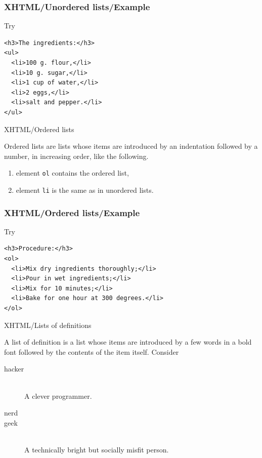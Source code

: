 %
\begin{frame}[containsverbatim]
\frametitle{XHTML/Unordered lists/Example}

Try
\begin{verbatim}
<h3>The ingredients:</h3>
<ul>
  <li>100 g. flour,</li>
  <li>10 g. sugar,</li>
  <li>1 cup of water,</li>
  <li>2 eggs,</li>
  <li>salt and pepper.</li>
</ul>
\end{verbatim}

\end{frame}

%
\begin{frame}{XHTML/Ordered lists}

Ordered lists are lists whose items are introduced by an indentation
followed by a number, in increasing order, like the following.
\begin{enumerate}

  \item element \texttt{ol} contains the ordered list,

  \item element \texttt{li} is the same as in unordered lists.

\end{enumerate}

\end{frame}

%
\begin{frame}[containsverbatim]
\frametitle{XHTML/Ordered lists/Example}

Try
\begin{verbatim}
<h3>Procedure:</h3>
<ol>
  <li>Mix dry ingredients thoroughly;</li>
  <li>Pour in wet ingredients;</li>
  <li>Mix for 10 minutes;</li>
  <li>Bake for one hour at 300 degrees.</li>
</ol>
\end{verbatim}

\end{frame}

%
\begin{frame}{XHTML/Lists of definitions}

A list of definition is a list whose items are introduced by a few
words in a bold font followed by the contents of the item
itself. Consider
\begin{description}

  \item[hacker]\ \\
    A clever programmer.

  \item[nerd]

  \item[geek]\ \\
    A technically bright but socially misfit person.

\end{description}


\end{frame}

